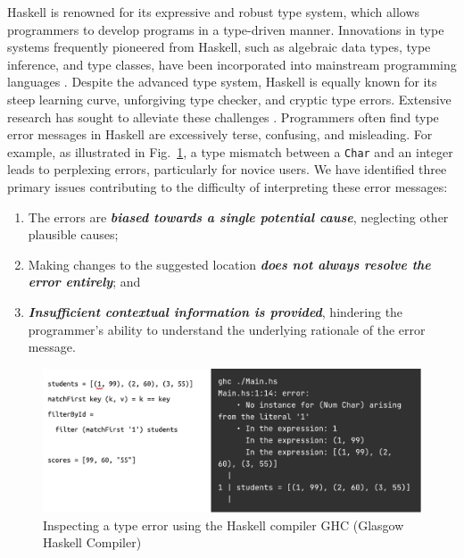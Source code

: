 \documentclass[pdflatex,lineno,sn-nature,Numbered]{sn-jnl}%
\begin{document}
Haskell is renowned for its expressive and robust type system, which allows programmers to develop programs in a type-driven manner. Innovations in type systems frequently pioneered from Haskell, such as algebraic data types, type inference, and type classes, have been incorporated into mainstream programming languages \cite{Hudak2007-kn, TypeScriptTeam_undated-qk, Klabnik_undated-mp, Griesemer_undated-ff}. Despite the advanced type system, Haskell is equally known for its steep learning curve, unforgiving type checker, and cryptic type errors. Extensive research has sought to alleviate these challenges \cite{Tirronen2015-nr, Chen2014-dz, Heeren2003-kd, Zhang2015-xy, Lerner2007-yq, Zhang2017-tj}. Programmers often find type error messages in Haskell are excessively terse, confusing, and misleading. For example, as illustrated in Fig.~\ref{fig:motivation}, a type mismatch between a {\tt Char} and an integer leads to perplexing errors, particularly for novice users. We have identified three primary issues contributing to the difficulty of interpreting these error messages:

\begin{enumerate}
    \item The errors are \textbf{\textit{biased towards a single potential cause}}, neglecting other plausible causes;
    \item Making changes to the suggested location \textbf{\textit{does not always resolve the error entirely}}; and
    \item \textbf{\textit{Insufficient contextual information is provided}}, hindering the programmer's ability to understand the underlying rationale of the error message.
\end{enumerate}


\begin{figure}[ht!]
    \centering
    \includegraphics[width=\linewidth]{images/motivation}
    \caption{Inspecting a type error using the Haskell compiler GHC (Glasgow Haskell Compiler)}
    \label{fig:motivation}
\end{figure}
\end{document}
